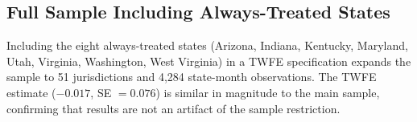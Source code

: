 \documentclass[12pt]{article}
\begin{document}
\subsection{Full Sample Including Always-Treated States}

Including the eight always-treated states (Arizona, Indiana, Kentucky, Maryland, Utah, Virginia, Washington, West Virginia) in a TWFE specification expands the sample to 51 jurisdictions and 4,284 state-month observations. The TWFE estimate ($-0.017$, SE $= 0.076$) is similar in magnitude to the main sample, confirming that results are not an artifact of the sample restriction.
\end{document}
